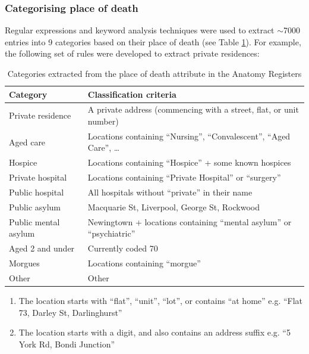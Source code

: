 \subsubsection{Categorising place of death}

Regular expressions and keyword analysis techniques were used to extract $\sim$7000 entries into 9 categories based on their place of death (see Table \ref{tab:categories}). For example, the following set of rules were developed to extract private residences:

\begin{table}
    \centering
    \caption{Categories extracted from the place of death attribute in the Anatomy Registers}
    \label{tab:categories}
    \begin{tabular}{ll}
        \toprule
        \textbf{Category} & \textbf{Classification criteria} \\
        \midrule
        Private residence & A private address (commencing with a street, flat, or unit number) \\
        Aged care & Locations containing ``Nursing'', ``Convalescent'', ``Aged Care'', \ldots \\
        Hospice & Locations containing ``Hospice'' + some known hospices \\
        Private hospital & Locations containing ``Private Hospital'' or ``surgery'' \\
        Public hospital & All hospitals without ``private'' in their name\\
        Public asylum & Macquarie St, Liverpool, George St, Rockwood \\
        Public mental asylum & Newingtown + locations containing ``mental asylum'' or ``psychiatric'' \\
        Aged 2 and under & Currently coded 70 \\
        Morgues & Locations containing ``morgue'' \\
        Other & Other \\
        \bottomrule
    \end{tabular}
\end{table}

\begin{enumerate}
    \item The location starts with ``flat'', ``unit'', ``lot'', or contains ``at home'' e.g. ``Flat 73, Darley St, Darlinghurst''
    \item The location starts with a digit, and also contains an address suffix e.g. ``5 York Rd, Bondi Junction''
\end{enumerate}

